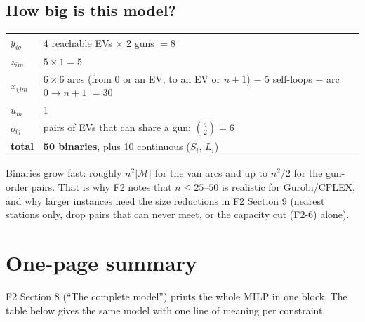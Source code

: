 \documentclass[11pt,a4paper]{article}
\newcommand{\M}{\mathcal{M}}
\begin{document}
\subsection{How big is this model?}
\begin{tabular}{@{}ll@{}}
$y_{ig}$ & 4 reachable EVs $\times$ 2 guns $=8$ \\
$z_{im}$ & $5\times1=5$ \\
$x_{ijm}$ & $6\times6$ arcs (from $0$ or an EV, to an EV or $n{+}1$) $-$ 5 self-loops $-$ arc $0\to n{+}1$ $=30$ \\
$u_m$ & 1 \\
$o_{ij}$ & pairs of EVs that can share a gun: $\binom{4}{2}=6$ \\
\textbf{total} & \textbf{50 binaries}, plus 10 continuous ($S_i$, $L_i$) \\
\end{tabular}

Binaries grow fast: roughly $n^2|\M|$ for the van arcs and up to $n^2/2$ for the gun-order pairs. That is why F2 notes that $n\le25$--$50$ is realistic for Gurobi/CPLEX, and why larger instances need the size reductions in F2 Section 9 (nearest stations only, drop pairs that can never meet, or the capacity cut (F2-6) alone).

\section{One-page summary}\label{sec:cheat}

F2 Section 8 (``The complete model'') prints the whole MILP in one block. The table below gives the same model with one line of meaning per constraint.
\end{document}
